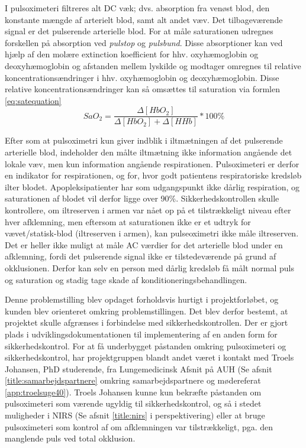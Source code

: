I pulsoximeteri filtreres alt DC væk; dvs. absorption fra venøst blod, den konstante mængde af arterielt blod, samt alt andet væv. Det tilbageværende signal er det pulserende arterielle blod. For at måle saturationen udregnes forskellen på absorption ved \textit{pulstop} og \textit{pulsbund}. Disse absorptioner kan ved hjælp af den molære extinction koefficient for hhv. oxyhæmoglobin og deoxyhæmoglobin og afstanden mellem lyskilde og modtager omregnes til relative koncentrationsændringer i hhv. oxyhæmoglobin og deoxyhæmoglobin. Disse relative koncentrationsændringer kan så omsættes til saturation via formlen \ref{eq:satequation}
\begin{equation}
	SaO_2 = \frac{\Delta[HbO_2]}{\Delta[HbO_2]+\Delta[HHb]} *100\%
	\label{eq:satequation}
\end{equation}

Efter som at pulsoximetri kun giver indblik i iltmætningen af det pulserende arterielle blod, indeholder den målte iltmætning ikke information angående det lokale væv, men kun information angående respirationen. Pulsoximeteri er derfor en indikator for respirationen, og for, hvor godt patientens respiratoriske kredsløb ilter blodet. Apopleksipatienter har som udgangspunkt ikke dårlig respiration, og saturationen af blodet vil derfor ligge over 90\%. Sikkerhedskontrollen skulle kontrollere, om iltreserven i armen var nået op på et tilstrækkeligt niveau efter hver afklemning, men eftersom at saturationen ikke er et udtryk for vævet/statisk-blod (iltreserven i armen), kan pulseoximetri ikke måle iltreserven.
Det er heller ikke muligt at måle AC værdier for det arterielle blod under en afklemning, fordi det pulserende signal ikke er tilstedeværende på grund af okklusionen. Derfor kan selv en person med dårlig kredsløb få målt normal puls og saturation og stadig tage skade af konditioneringsbehandlingen. 

Denne problemstilling blev opdaget forholdsvis hurtigt i projektforløbet, og kunden blev orienteret omkring problemstillingen. Det blev derfor bestemt, at projektet skulle afgrænses i forbindelse med sikkerhedskontrollen. Der er gjort plads i udviklingsdokumentationen til implementering af en anden form for sikkerhedskontrol. For at få underbygget påstanden omkring pulsoximeteri og sikkerhedskontrol, har projektgruppen blandt andet været i kontakt med Troels Johansen, PhD studerende, fra Lungemedicinsk Afsnit på AUH (Se afsnit \ref{title:samarbejdspartnere} omkring samarbejdspartnere og mødereferat \ref{app:troelsuge40}). Troels Johansen kunne kun bekræfte påstanden om pulsoximeteri som værende ugyldig til sikkerhedskontrol, og så i stedet muligheder i NIRS (Se afsnit \ref{title:nirs} i perspektivering) eller at bruge pulsoximeteri som kontrol af om afklemningen var tilstrækkeligt, pga.  den manglende puls ved total okklusion.

